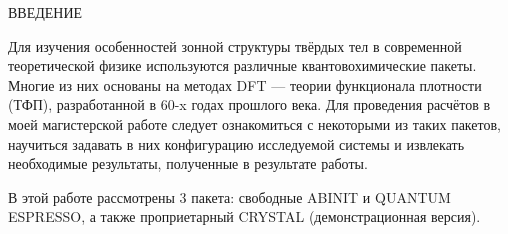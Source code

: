 \begin{center}
    ВВЕДЕНИЕ
\end{center}

Для изучения особенностей зонной структуры твёрдых тел в современной теоретической физике используются различные квантовохимические пакеты. Многие из них основаны на методах DFT --- теории функционала плотности (ТФП), разработанной в 60-x годах прошлого века. Для проведения расчётов в моей магистерской работе следует ознакомиться с некоторыми из таких пакетов, научиться задавать в них конфигурацию исследуемой системы и извлекать необходимые результаты, полученные в результате работы. 

В этой работе рассмотрены 3 пакета: свободные ABINIT и QUANTUM ESPRESSO, а также проприетарный CRYSTAL (демонстрационная версия).
